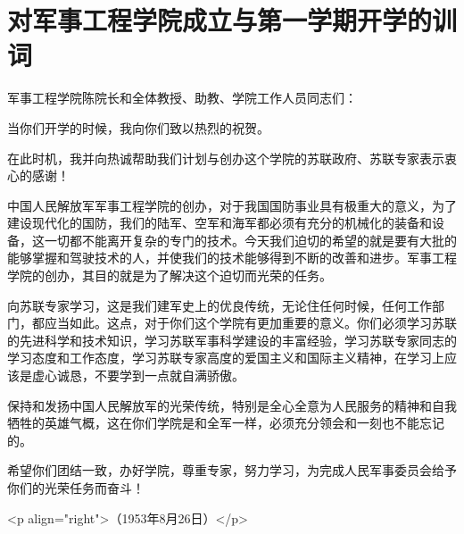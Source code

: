 \section[对军事工程学院成立与第一学期开学的训词（一九五三年八月二十六日）]{对军事工程学院成立与第一学期开学的训词}


军事工程学院陈院长和全体教授、助教、学院工作人员同志们：

当你们开学的时候，我向你们致以热烈的祝贺。

在此时机，我并向热诚帮助我们计划与创办这个学院的苏联政府、苏联专家表示衷心的感谢！

中国人民解放军军事工程学院的创办，对于我国国防事业具有极重大的意义，为了建设现代化的国防，我们的陆军、空军和海军都必须有充分的机械化的装备和设备，这一切都不能离开复杂的专门的技术。今天我们迫切的希望的就是要有大批的能够掌握和驾驶技术的人，并使我们的技术能够得到不断的改善和进步。军事工程学院的创办，其目的就是为了解决这个迫切而光荣的任务。

向苏联专家学习，这是我们建军史上的优良传统，无论住任何时候，任何工作部门，都应当如此。这点，对于你们这个学院有更加重要的意义。你们必须学习苏联的先进科学和技术知识，学习苏联军事科学建设的丰富经验，学习苏联专家同志的学习态度和工作态度，学习苏联专家高度的爱国主义和国际主义精神，在学习上应该是虚心诚恳，不要学到一点就自满骄傲。

保持和发扬中国人民解放军的光荣传统，特别是全心全意为人民服务的精神和自我牺牲的英雄气概，这在你们学院是和全军一样，必须充分领会和一刻也不能忘记的。

希望你们团结一致，办好学院，尊重专家，努力学习，为完成人民军事委员会给予你们的光荣任务而奋斗！

<p align="right">（1953年8月26日）</p>


